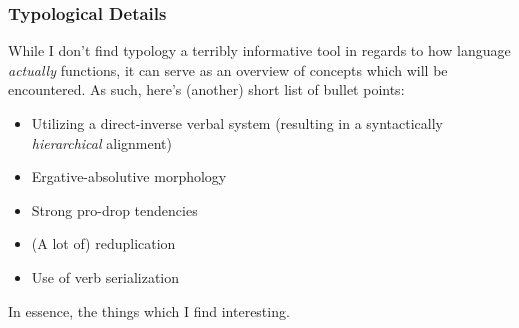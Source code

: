 \subsubsection{Typological Details}
While I don't find typology a terribly informative tool in regards to how language \textit{actually} functions, it can serve as an overview of concepts which will be encountered. As such, here's (another) short list of bullet points:

\begin{itemize}
  \item Utilizing a direct-inverse verbal system (resulting in a syntactically \textit{hierarchical} alignment)
  \item Ergative-absolutive morphology
  \item Strong pro-drop tendencies
  \item (A lot of) reduplication
  \item Use of verb serialization
\end{itemize}

In essence, the things which I find interesting.
